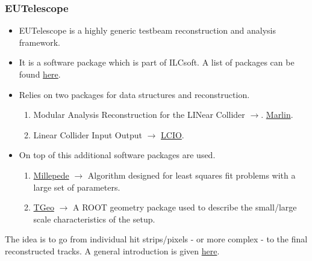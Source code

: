 \documentclass{beamer}
\begin{document}
\begin{frame}
\frametitle{EUTelescope} 
\begin{itemize}
\item EUTelescope is a highly generic testbeam reconstruction and analysis framework.
\item It is a software package which is part of ILCsoft. A list of packages can be found \href{http://ilcsoft.desy.de/portal/software_packages/}{here}.
\item Relies on two packages for data structures and reconstruction.
 \begin{enumerate}
	\item Modular Analysis Reconstruction for the LINear Collider $\rightarrow$. \href{http://ilcsoft.desy.de/portal/software_packages/marlin/|}{Marlin}.
	\item Linear Collider Input Output $\rightarrow$ \href{http://ilcsoft.desy.de/portal/software_packages/lcio/}{LCIO}.
\end{enumerate}
\item On top of this additional software packages are used. 
\begin{enumerate}
	\item \href{http://www.desy.de/~blobel/mptalks.html}{Millepede}  $\rightarrow$ Algorithm designed for least squares fit problems with a large set of parameters.
	\item \href{ftp://root.cern.ch/root/doc/18Geometry.pdf}{TGeo} $\rightarrow$ A ROOT geometry package used to describe the small/large scale characteristics of the setup.
\end{enumerate}
\end{itemize}
The idea is to go from individual hit strips/pixels - or more complex - to the final reconstructed tracks. 
A general introduction is given \href{https://cds.cern.ch/record/2000969/files/AIDA-NOTE-2015-009.pdf}{here}.
\end{frame}
\end{document}
